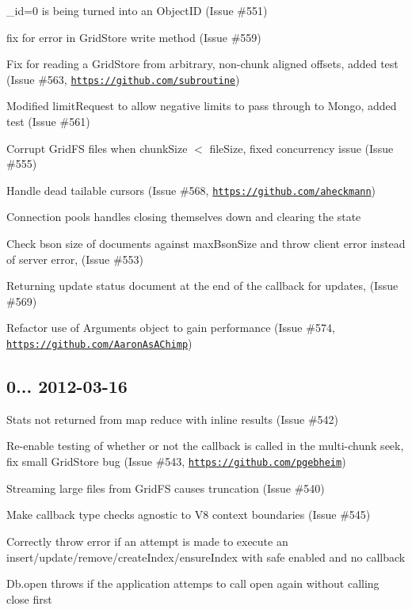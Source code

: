 \begin{DoxyItemize}
\item \+\_\+id=0 is being turned into an Object\+ID (Issue \#551)
\item fix for error in Grid\+Store write method (Issue \#559)
\item Fix for reading a Grid\+Store from arbitrary, non-\/chunk aligned offsets, added test (Issue \#563, \href{https://github.com/subroutine}{\tt https\+://github.\+com/subroutine})
\item Modified limit\+Request to allow negative limits to pass through to Mongo, added test (Issue \#561)
\item Corrupt Grid\+FS files when chunk\+Size $<$ file\+Size, fixed concurrency issue (Issue \#555)
\item Handle dead tailable cursors (Issue \#568, \href{https://github.com/aheckmann}{\tt https\+://github.\+com/aheckmann})
\item Connection pools handles closing themselves down and clearing the state
\item Check bson size of documents against max\+Bson\+Size and throw client error instead of server error, (Issue \#553)
\item Returning update status document at the end of the callback for updates, (Issue \#569)
\item Refactor use of Arguments object to gain performance (Issue \#574, \href{https://github.com/AaronAsAChimp}{\tt https\+://github.\+com/\+Aaron\+As\+A\+Chimp})
\end{DoxyItemize}

\subsection*{0... 2012-\/03-\/16 }


\begin{DoxyItemize}
\item Stats not returned from map reduce with inline results (Issue \#542)
\item Re-\/enable testing of whether or not the callback is called in the multi-\/chunk seek, fix small Grid\+Store bug (Issue \#543, \href{https://github.com/pgebheim}{\tt https\+://github.\+com/pgebheim})
\item Streaming large files from Grid\+FS causes truncation (Issue \#540)
\item Make callback type checks agnostic to V8 context boundaries (Issue \#545)
\item Correctly throw error if an attempt is made to execute an insert/update/remove/create\+Index/ensure\+Index with safe enabled and no callback
\item Db.\+open throws if the application attemps to call open again without calling close first
\end{DoxyItemize}

